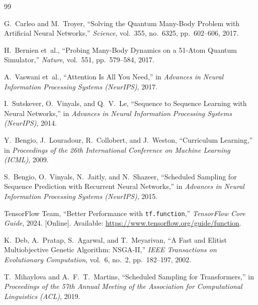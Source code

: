 \documentclass[10pt,a4paper]{article}
\begin{document}
\begin{thebibliography}{99}

G.~Carleo and M.~Troyer,
``Solving the Quantum Many-Body Problem with Artificial Neural Networks,''
\textit{Science}, vol.~355, no.~6325, pp.~602--606, 2017.

H.~Bernien et~al.,
``Probing Many-Body Dynamics on a 51-Atom Quantum Simulator,''
\textit{Nature}, vol.~551, pp.~579--584, 2017.

A.~Vaswani et~al.,
``Attention Is All You Need,''
in \textit{Advances in Neural Information Processing Systems (NeurIPS)}, 2017.

I.~Sutskever, O.~Vinyals, and Q.~V.~Le,
``Sequence to Sequence Learning with Neural Networks,''
in \textit{Advances in Neural Information Processing Systems (NeurIPS)}, 2014.

Y.~Bengio, J.~Louradour, R.~Collobert, and J.~Weston,
``Curriculum Learning,''
in \textit{Proceedings of the 26th International Conference on Machine Learning (ICML)}, 2009.

S.~Bengio, O.~Vinyals, N.~Jaitly, and N.~Shazeer,
``Scheduled Sampling for Sequence Prediction with Recurrent Neural Networks,''
in \textit{Advances in Neural Information Processing Systems (NeurIPS)}, 2015.

TensorFlow Team,
``Better Performance with \texttt{tf.function},''
\textit{TensorFlow Core Guide}, 2024. [Online]. Available: \url{https://www.tensorflow.org/guide/function}.

K.~Deb, A.~Pratap, S.~Agarwal, and T.~Meyarivan,
``A Fast and Elitist Multiobjective Genetic Algorithm: NSGA-II,''
\textit{IEEE Transactions on Evolutionary Computation}, vol.~6, no.~2, pp.~182--197, 2002.

T.~Mihaylova and A.~F.~T.~Martins,
``Scheduled Sampling for Transformers,''
in \textit{Proceedings of the 57th Annual Meeting of the Association for Computational Linguistics (ACL)}, 2019.

\end{thebibliography}
\end{document}
